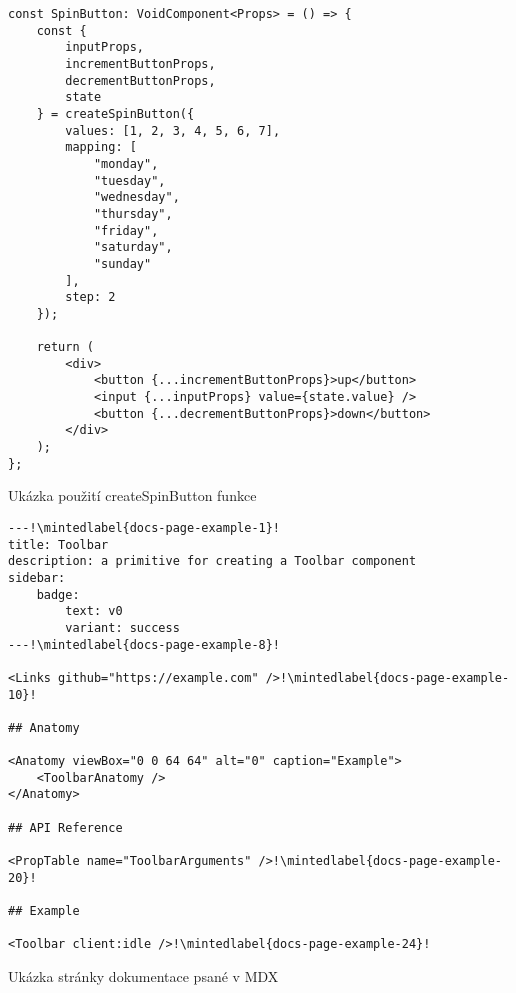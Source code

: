 \begin{listing}
    \begin{verbatim}
const SpinButton: VoidComponent<Props> = () => {
    const { 
        inputProps,
        incrementButtonProps,
        decrementButtonProps,
        state
    } = createSpinButton({
        values: [1, 2, 3, 4, 5, 6, 7],
        mapping: [
            "monday",
            "tuesday",
            "wednesday",
            "thursday",
            "friday",
            "saturday",
            "sunday"
        ],
        step: 2
    });

    return (
        <div>
            <button {...incrementButtonProps}>up</button>
            <input {...inputProps} value={state.value} />
            <button {...decrementButtonProps}>down</button>
        </div>
    );
};
\end{verbatim}
    \caption{Ukázka použití createSpinButton funkce}
    \label{spinbutton-example}
\end{listing}

\begin{listing}
    \begin{verbatim}
---!\mintedlabel{docs-page-example-1}!
title: Toolbar
description: a primitive for creating a Toolbar component
sidebar:
    badge:
        text: v0
        variant: success
---!\mintedlabel{docs-page-example-8}!

<Links github="https://example.com" />!\mintedlabel{docs-page-example-10}!

## Anatomy

<Anatomy viewBox="0 0 64 64" alt="0" caption="Example">
    <ToolbarAnatomy />
</Anatomy>

## API Reference

<PropTable name="ToolbarArguments" />!\mintedlabel{docs-page-example-20}!

## Example

<Toolbar client:idle />!\mintedlabel{docs-page-example-24}!
\end{verbatim}
    \caption{Ukázka stránky dokumentace psané v MDX}
    \label{docs-page-example}
\end{listing}
